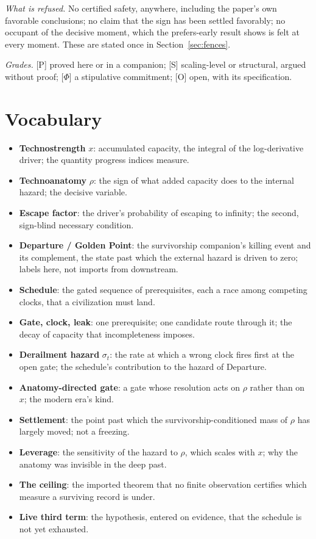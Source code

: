 \documentclass[11pt]{article}
\theoremstyle{plain}
\theoremstyle{definition}
\theoremstyle{remark}
\begin{document}
\emph{What is refused.} No certified safety, anywhere, including the
paper's own favorable conclusions; no claim that the sign has been
settled favorably; no occupant of the decisive moment, which the
prefers-early result shows is felt at every moment. These are stated once
in Section~\ref{sec:fences}.

\emph{Grades.} [P] proved here or in a companion; [S] scaling-level or
structural, argued without proof; [$\Phi$] a stipulative commitment; [O]
open, with its specification.

\section{Vocabulary}\label{sec:vocab}
\begin{itemize}[itemsep=2pt]
\item \textbf{Technostrength} $x$: accumulated capacity, the integral of
the log-derivative driver; the quantity progress indices measure.
\item \textbf{Technoanatomy} $\rho$: the sign of what added capacity does
to the internal hazard; the decisive variable.
\item \textbf{Escape factor}: the driver's probability of escaping to
infinity; the second, sign-blind necessary condition.
\item \textbf{Departure / Golden Point}: the survivorship companion's
killing event and its complement, the state past which the external
hazard is driven to zero; labels here, not imports from downstream.
\item \textbf{Schedule}: the gated sequence of prerequisites, each a race
among competing clocks, that a civilization must land.
\item \textbf{Gate, clock, leak}: one prerequisite; one candidate route
through it; the decay of capacity that incompleteness imposes.
\item \textbf{Derailment hazard} $\sigma_t$: the rate at which a wrong
clock fires first at the open gate; the schedule's contribution to the
hazard of Departure.
\item \textbf{Anatomy-directed gate}: a gate whose resolution acts on
$\rho$ rather than on $x$; the modern era's kind.
\item \textbf{Settlement}: the point past which the survivorship-conditioned
mass of $\rho$ has largely moved; not a freezing.
\item \textbf{Leverage}: the sensitivity of the hazard to $\rho$, which
scales with $x$; why the anatomy was invisible in the deep past.
\item \textbf{The ceiling}: the imported theorem that no finite
observation certifies which measure a surviving record is under.
\item \textbf{Live third term}: the hypothesis, entered on evidence, that
the schedule is not yet exhausted.
\end{itemize}
\end{document}
